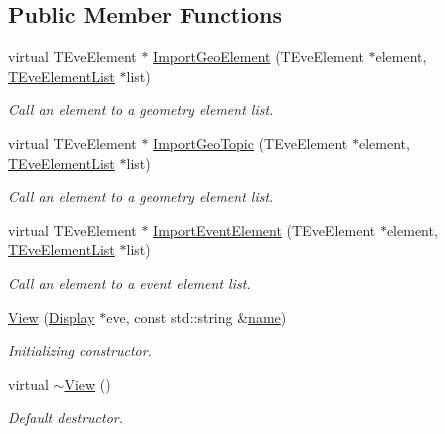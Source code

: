\subsection*{Public Member Functions}
\begin{DoxyCompactItemize}
\item 
virtual T\+Eve\+Element $\ast$ \hyperlink{class_d_d4hep_1_1_view_adc25ba7ece97c2f7c69f8fa6e0c13088}{Import\+Geo\+Element} (T\+Eve\+Element $\ast$element, \hyperlink{class_t_eve_element_list}{T\+Eve\+Element\+List} $\ast$list)
\begin{DoxyCompactList}\small\item\em Call an element to a geometry element list. \end{DoxyCompactList}\item 
virtual T\+Eve\+Element $\ast$ \hyperlink{class_d_d4hep_1_1_view_a413a1148e0fb6d3007c971e9f1266629}{Import\+Geo\+Topic} (T\+Eve\+Element $\ast$element, \hyperlink{class_t_eve_element_list}{T\+Eve\+Element\+List} $\ast$list)
\begin{DoxyCompactList}\small\item\em Call an element to a geometry element list. \end{DoxyCompactList}\item 
virtual T\+Eve\+Element $\ast$ \hyperlink{class_d_d4hep_1_1_view_acd696f9f50bda0d632cec822ab1f4672}{Import\+Event\+Element} (T\+Eve\+Element $\ast$element, \hyperlink{class_t_eve_element_list}{T\+Eve\+Element\+List} $\ast$list)
\begin{DoxyCompactList}\small\item\em Call an element to a event element list. \end{DoxyCompactList}\item 
\hyperlink{class_d_d4hep_1_1_view_a69c5b7344436a9b030d9a64ead608de8}{View} (\hyperlink{class_d_d4hep_1_1_display}{Display} $\ast$eve, const std\+::string \&\hyperlink{class_d_d4hep_1_1_view_ae369eadf16399a6bf34f1ce491b7a788}{name})
\begin{DoxyCompactList}\small\item\em Initializing constructor. \end{DoxyCompactList}\item 
virtual \hyperlink{class_d_d4hep_1_1_view_ad0dc854db9aabbea98a334dec89f785c}{$\sim$\+View} ()
\begin{DoxyCompactList}\small\item\em Default destructor. \end{DoxyCompactList}\item 

\end{DoxyCompactItemize}
